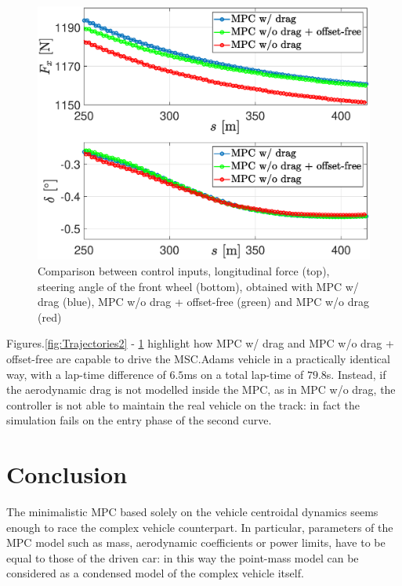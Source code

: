 \documentclass[conference]{IEEEtran} %
\begin{document}
\begin{figure}[htb] \centering
	\includegraphics[width=1.\linewidth]{steer_fx} %
	\caption{Comparison between control inputs, longitudinal force (top), steering angle of the front wheel (bottom), obtained with MPC w/ drag (blue), MPC w/o drag + offset-free (green) and MPC w/o drag (red)}
	\label{fig:steer_fx}
\end{figure}

Figures.\ref{fig:Trajectories2} - \ref{fig:steer_fx} highlight how MPC w/ drag and MPC w/o drag + offset-free are capable to drive the MSC.Adams vehicle in a practically identical way, with a lap-time difference of $6.5$ms on a total lap-time of $79.8$s. Instead, if the aerodynamic drag is not modelled inside the MPC, as in MPC w/o drag, the controller is not able to maintain the real vehicle on the track: in fact the simulation fails on the entry phase of the second curve.



\section{Conclusion}
The minimalistic MPC based solely on the vehicle centroidal dynamics seems enough to race the complex vehicle counterpart.
In particular, parameters of the MPC model such as mass, aerodynamic coefficients or power limits, have to be equal to those of the driven car: in this way the point-mass model can be considered as a condensed model of the complex vehicle itself.
\end{document}
